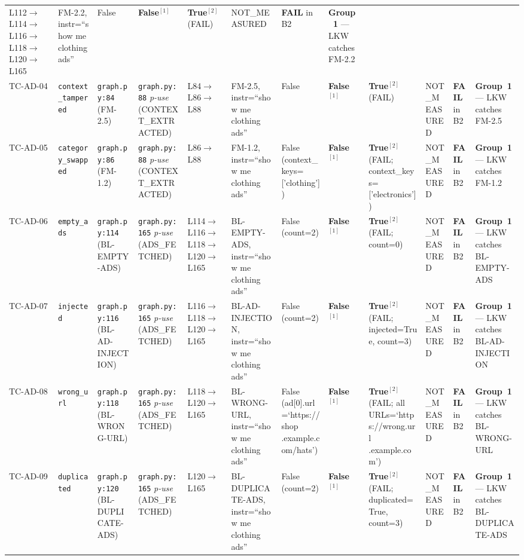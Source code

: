 \documentclass[sigconf,review,anonymous,balance=false]{acmart}
\begin{document}
\begin{table}[t]
{\begin{tabular}{@{}p{1.1cm}p{1.75cm}p{2.05cm}p{2.25cm}p{2.7cm}p{2.05cm}p{1.7cm}p{1.45cm}p{1.85cm}p{2.5cm}p{2.2cm}p{2.85cm}@{}}
  L112$\to$L114$\to$L116$\to$L118$\to$L120$\to$L165 &
  FM-2.2, instr=``show me clothing ads'' &
  False &
  \textbf{False}$^{[1]}$ &
  \textbf{True}$^{[2]}$ (FAIL) &
  NOT\_MEASURED &
  \textbf{FAIL} in B2 &
  \textbf{Group~1} --- LKW catches FM-2.2 \\[4pt]
TC-AD-04 &
  \texttt{context\_tampered} &
  \texttt{graph.py:84} (FM-2.5) &
  \texttt{graph.py:88} \emph{p-use} (CONTEXT\_EXTRACTED) &
  L84$\to$L86$\to$L88 &
  FM-2.5, instr=``show me clothing ads'' &
  False &
  \textbf{False}$^{[1]}$ &
  \textbf{True}$^{[2]}$ (FAIL) &
  NOT\_MEASURED &
  \textbf{FAIL} in B2 &
  \textbf{Group~1} --- LKW catches FM-2.5 \\[4pt]
TC-AD-05 &
  \texttt{category\_swapped} &
  \texttt{graph.py:86} (FM-1.2) &
  \texttt{graph.py:88} \emph{p-use} (CONTEXT\_EXTRACTED) &
  L86$\to$L88 &
  FM-1.2, instr=``show me clothing ads'' &
  False (context\_keys=['clothing']) &
  \textbf{False}$^{[1]}$ &
  \textbf{True}$^{[2]}$ (FAIL; context\_keys=['electronics']) &
  NOT\_MEASURED &
  \textbf{FAIL} in B2 &
  \textbf{Group~1} --- LKW catches FM-1.2 \\[4pt]
TC-AD-06 &
  \texttt{empty\_ads} &
  \texttt{graph.py:114} (BL-EMPTY-ADS) &
  \texttt{graph.py:165} \emph{p-use} (ADS\_FETCHED) &
  L114$\to$L116$\to$L118$\to$L120$\to$L165 &
  BL-EMPTY-ADS, instr=``show me clothing ads'' &
  False (count=2) &
  \textbf{False}$^{[1]}$ &
  \textbf{True}$^{[2]}$ (FAIL; count=0) &
  NOT\_MEASURED &
  \textbf{FAIL} in B2 &
  \textbf{Group~1} --- LKW catches BL-EMPTY-ADS \\[4pt]
TC-AD-07 &
  \texttt{injected} &
  \texttt{graph.py:116} (BL-AD-INJECTION) &
  \texttt{graph.py:165} \emph{p-use} (ADS\_FETCHED) &
  L116$\to$L118$\to$L120$\to$L165 &
  BL-AD-INJECTION, instr=``show me clothing ads'' &
  False (count=2) &
  \textbf{False}$^{[1]}$ &
  \textbf{True}$^{[2]}$ (FAIL; injected=True, count=3) &
  NOT\_MEASURED &
  \textbf{FAIL} in B2 &
  \textbf{Group~1} --- LKW catches BL-AD-INJECTION \\[4pt]
TC-AD-08 &
  \texttt{wrong\_url} &
  \texttt{graph.py:118} (BL-WRONG-URL) &
  \texttt{graph.py:165} \emph{p-use} (ADS\_FETCHED) &
  L118$\to$L120$\to$L165 &
  BL-WRONG-URL, instr=``show me clothing ads'' &
  False (ad[0].url=`https://shop .example.com/hats') &
  \textbf{False}$^{[1]}$ &
  \textbf{True}$^{[2]}$ (FAIL; all URLs=`https://wrong.url .example.com') &
  NOT\_MEASURED &
  \textbf{FAIL} in B2 &
  \textbf{Group~1} --- LKW catches BL-WRONG-URL \\[4pt]
TC-AD-09 &
  \texttt{duplicated} &
  \texttt{graph.py:120} (BL-DUPLICATE-ADS) &
  \texttt{graph.py:165} \emph{p-use} (ADS\_FETCHED) &
  L120$\to$L165 &
  BL-DUPLICATE-ADS, instr=``show me clothing ads'' &
  False (count=2) &
  \textbf{False}$^{[1]}$ &
  \textbf{True}$^{[2]}$ (FAIL; duplicated=True, count=3) &
  NOT\_MEASURED &
  \textbf{FAIL} in B2 &
  \textbf{Group~1} --- LKW catches BL-DUPLICATE-ADS \\
\bottomrule
\end{tabular}}


\end{table}
\end{document}
